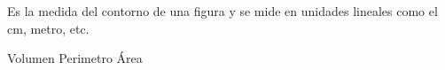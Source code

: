 
\question Es la medida del contorno de una figura y se mide en unidades
          lineales como el cm, metro, etc.

  \begin{oneparchoices}
    \choice Volumen
    \CorrectChoice Perimetro 
    \choice  Área
  \end{oneparchoices}
